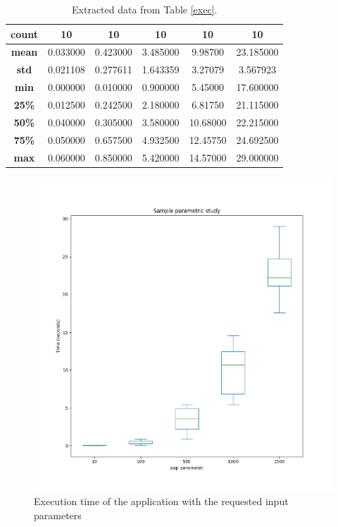 \documentclass[11pt]{article}
\begin{document}
\begin{table}
\begin{tabular}{|c|c|c|c|c|c|}
\textbf{count} & 10          & 10           & 10           & 10            & 10            \\ \hline
\textbf{mean}  & 0.033000    & 0.423000     & 3.485000     & 9.98700       & 23.185000     \\ \hline
\textbf{std}   & 0.021108    & 0.277611     & 1.643359     & 3.27079       & 3.567923      \\ \hline
\textbf{min}   & 0.000000    & 0.010000     & 0.900000     & 5.45000       & 17.600000     \\ \hline
\textbf{25\%}   & 0.012500    & 0.242500     & 2.180000     & 6.81750       & 21.115000     \\ \hline
\textbf{50\%}   & 0.040000    & 0.305000     & 3.580000     & 10.68000      & 22.215000     \\ \hline
\textbf{75\%}   & 0.050000    & 0.657500     & 4.932500     & 12.45750      & 24.692500     \\ \hline
\textbf{max}   & 0.060000    & 0.850000     & 5.420000     & 14.57000      & 29.000000     \\ \hline
\end{tabular}
\caption{\label{df}Extracted data from Table \ref{exec}.}
\end{table}

\pagebreak
\begin{figure}[h]
\caption{Execution time of the application with the requested input parameters}
\centering
\includegraphics{boxes.png}
\end{figure}
\end{document}
